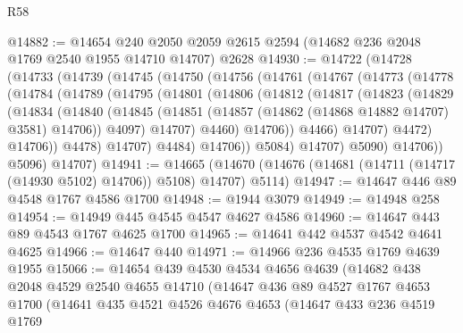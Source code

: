 \begin{lexlean}{R58}
\begin{coremodule}
@14882 := @14654
    @240
    @2050
    @2059
    @2615
    @2594
    (@14682 @236 @2048 @1769 @2540 @1955 @14710 @14707)
    @2628
@14930 := @14722
    (@14728
      (@14733
        (@14739
          (@14745
            (@14750
              (@14756
                (@14761
                  (@14767
                    (@14773
                      (@14778
                        (@14784
                          (@14789
                            (@14795
                              (@14801
                                (@14806
                                  (@14812
                                    (@14817
                                      (@14823
                                        (@14829
                                          (@14834
                                            (@14840
                                              (@14845
                                                (@14851
                                                  (@14857
                                                    (@14862 (@14868 @14882 @14707) @3581)
                                                    @14706))
                                                @4097)
                                              @14707)
                                            @4460)
                                          @14706))
                                      @4466)
                                    @14707)
                                  @4472)
                                @14706))
                            @4478)
                          @14707)
                        @4484)
                      @14706))
                  @5084)
                @14707)
              @5090)
            @14706))
        @5096)
      @14707)
@14941 := @14665
    (@14670 (@14676 (@14681 (@14711 (@14717 (@14930 @5102) @14706)) @5108) @14707) @5114)
@14947 := @14647 @446 @89 @4548 @1767 @4586 @1700
@14948 := @1944 @3079
@14949 := @14948 @258
@14954 := @14949 @445 @4545 @4547 @4627 @4586
@14960 := @14647 @443 @89 @4543 @1767 @4625 @1700
@14965 := @14641 @442 @4537 @4542 @4641 @4625
@14966 := @14647 @440
@14971 := @14966 @236 @4535 @1769 @4639 @1955
@15066 := @14654
    @439
    @4530
    @4534
    @4656
    @4639
    (@14682
      @438
      @2048
      @4529
      @2540
      @4655
      @14710
      (@14647
        @436
        @89
        @4527
        @1767
        @4653
        @1700
        (@14641
          @435
          @4521
          @4526
          @4676
          @4653
          (@14647
            @433
            @236
            @4519
            @1769

\end{coremodule}
\end{lexlean}
